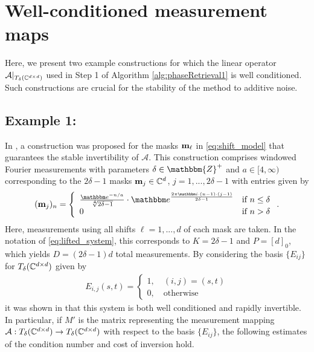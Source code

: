 \section{Well-conditioned measurement maps}
\label{sec:MeasMatrix}
Here, we present two example constructions for which the linear operator $\mathcal{A}|_{T_\delta(\mathbb{C}^{d\times d})}$ used in Step 1 of Algorithm \ref{alg:phaseRetrieval1} is well conditioned. Such constructions are crucial for the stability of the method to additive noise. 

\subsection*{Example 1:} 
In \cite{IVW2015_FastPhase}, a construction was proposed for the masks $\mathbf m_\ell$ in \eqref{eq:shift_model} that guarantees the stable invertibility of $\mathcal{A}$.  This construction comprises windowed Fourier measurements with parameters $\delta \in \mathbbm{Z}^+$ and $a \in [4, \infty)$ corresponding to the $2\delta-1$ masks $\mathbf m_j\in\mathbb{C}^d$, $j=1,...,2\delta-1$ with entries given by
%
\begin{equation}
(\m_j)_{n} = \left\{ \begin{array}{ll}
    \frac{\ee^{-n/a}}{\sqrt[4]{2\delta -1}} \cdot
    \ee^{\frac{2 \pi \ii \cdot (n - 1) \cdot (j -1)}
    {2\delta - 1}} & \textrm{if}~n \leq \delta \\ 
    0 & \textrm{if}~n >  \delta\end{array} \right. .
    \label{eq:MeasDef}
\end{equation}
%
Here, measurements using all shifts $\ell = 1,..., d$ of each mask are taken.  In the notation of \eqref{eq:lifted_system}, this corresponds to  $K = 2\delta - 1$ and $P = [d]_0$, which yields $D = (2\delta - 1)d$ total measurements.  By considering the basis $\{E_{ij}\}$ for $T_\delta(\mathbb{C}^{d \times d})$ given by %
\begin{align}\nonumber
E_{i,j}(s,t) =\left\{\begin{array}{l} 1, \quad (i,j)=(s,t)\\ 0, \quad \text{otherwise}\end{array}\right.
\end{align}
it was shown in \cite{IVW2015_FastPhase} that this system is both well conditioned and rapidly invertible.  In particular, if $M'$ is the matrix representing the measurement mapping $\mathcal{A} : T_{\delta}(\mathbb{C}^{d \times d}) \to T_{\delta}(\mathbb{C}^{d \times d})$ with respect to the basis $\{E_{ij}\}$, the following estimates of the condition number and cost of inversion hold.

